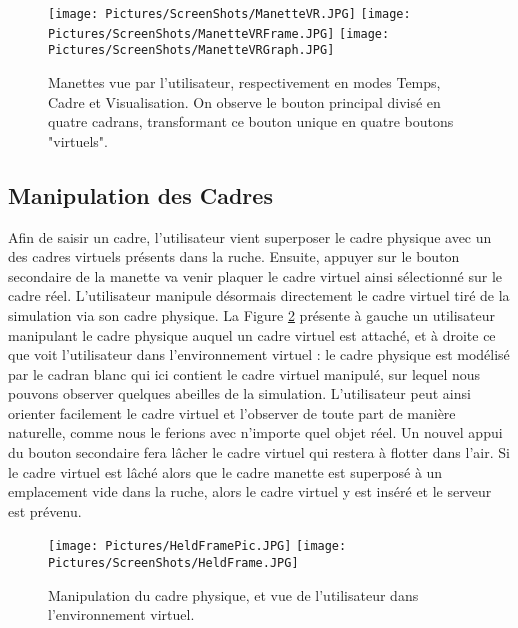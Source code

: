 		\begin{figure}
		\centering
		\texttt{[image: Pictures/ScreenShots/ManetteVR.JPG]}
		\texttt{[image: Pictures/ScreenShots/ManetteVRFrame.JPG]}
		\texttt{[image: Pictures/ScreenShots/ManetteVRGraph.JPG]}
		\caption[Manette vue par l'utilisateur, respectivement en mode Temps, Cadre et Visualisation.]{Manettes vue par l'utilisateur, respectivement en modes Temps, Cadre et Visualisation. On observe le bouton principal divisé en quatre cadrans, transformant ce bouton unique en quatre boutons "virtuels".}
		\label{ManetteVR}
		\end{figure}
		
		\subsection{Manipulation des Cadres}		
		
			
		Afin de saisir un cadre, l'utilisateur vient superposer le cadre physique avec un des cadres virtuels présents dans la ruche. Ensuite, appuyer sur le bouton secondaire de la manette va venir plaquer le cadre virtuel ainsi sélectionné sur le cadre réel. L'utilisateur manipule désormais directement le cadre virtuel tiré de la simulation via son cadre physique. La Figure \ref{equiVRTUI} présente à gauche un utilisateur manipulant le cadre physique auquel un cadre virtuel est attaché, et à droite ce que voit l'utilisateur dans l'environnement virtuel : le cadre physique est modélisé par le cadran blanc qui ici contient le cadre virtuel manipulé, sur lequel nous pouvons observer quelques abeilles de la simulation. L'utilisateur peut ainsi orienter facilement le cadre virtuel et l'observer de toute part de manière naturelle, comme nous le ferions avec n'importe quel objet réel. Un nouvel appui du bouton secondaire fera lâcher le cadre virtuel qui restera à flotter dans l'air. Si le cadre virtuel est lâché alors que le cadre manette est superposé à un emplacement vide dans la ruche, alors le cadre virtuel y est inséré et le serveur est prévenu.	

	\begin{figure}
	\centering
	\texttt{[image: Pictures/HeldFramePic.JPG]}
	\texttt{[image: Pictures/ScreenShots/HeldFrame.JPG]}
	\caption{Manipulation du cadre physique, et vue de l'utilisateur dans l'environnement virtuel.}
	\label{equiVRTUI}
	\end{figure}
		
